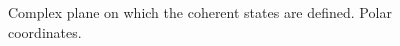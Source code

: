 \begin{figure}
\centering

\caption{Complex plane on which the coherent states are defined. Polar coordinates.}
\label{figCh1_Coh}
\end{figure}